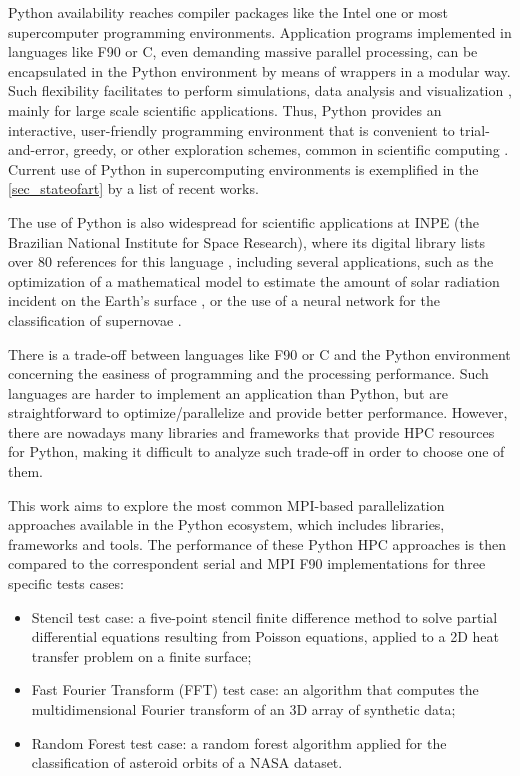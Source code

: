 Python availability reaches compiler packages like the Intel one \cite {Cielo2019} or most supercomputer programming environments. Application programs implemented in languages like F90 or C, even demanding massive parallel processing, can be encapsulated in the Python environment by means of wrappers in a modular way. Such flexibility facilitates to perform simulations, data analysis and visualization \cite {Beazley1997}, mainly for large scale scientific applications. Thus, Python provides an interactive, user-friendly programming environment that is convenient to trial-and-error, greedy, or other exploration schemes, common in scientific computing \cite {Hinsen1997}. Current use of Python in supercomputing environments is exemplified in the \autoref {sec_stateofart} by a list of recent works.

The use of Python is also widespread for scientific applications at INPE (the Brazilian National Institute for Space Research), where its digital library lists over 80 references for this language \cite {Inpe2020}, including several applications, such as the optimization of a mathematical model to estimate the amount of solar radiation incident on the Earth's surface \cite {Souza2018}, or the use of a neural network for the classification of supernovae \cite {Nascimento2019}. 

There is a trade-off between languages like F90 or C and the Python environment concerning the easiness of programming and the processing performance. Such languages are harder to implement an application than Python, but are straightforward to optimize/parallelize and provide better performance. However, there are nowadays many libraries and frameworks that provide HPC resources for Python, making it difficult to analyze such trade-off in order to choose one of them.

This work aims to explore the most common MPI-based \cite {Dalcin2008} parallelization approaches available in the Python ecosystem, which includes libraries, frameworks and tools.  The performance of these Python HPC approaches is then compared to the correspondent serial and MPI F90 implementations for three specific tests cases:

\begin{itemize}

\item Stencil test case: a five-point stencil finite difference method to solve partial differential equations resulting from Poisson equations, applied to a 2D heat transfer problem on a finite surface;

\item Fast Fourier Transform (FFT) test case: an algorithm that computes the multidimensional Fourier transform of an 3D array of synthetic data; 

\item Random Forest test case: a random forest algorithm applied for the classification of asteroid orbits of a NASA dataset.

\end{itemize}

